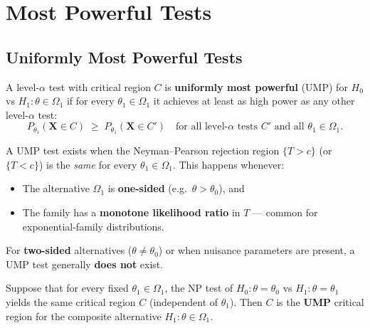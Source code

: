 \documentclass[11pt, a4paper]{article}
\begin{document}
\newpage
\section{Most Powerful Tests}

\subsection*{Uniformly Most Powerful Tests}

\begin{defbox}
A level-$\alpha$ test with critical region $C$ is \textbf{uniformly most powerful} (UMP) for $H_0$ vs $H_1\colon \theta \in \Omega_1$ if for every $\theta_1 \in \Omega_1$ it achieves at least as high power as any other level-$\alpha$ test:
\[
  P_{\theta_1}(\mathbf{X} \in C) \;\geq\; P_{\theta_1}(\mathbf{X} \in C')
  \quad \text{for all level-}\alpha \text{ tests } C' \text{ and all } \theta_1 \in \Omega_1.
\]
\end{defbox}

\begin{warnbox}
A UMP test exists when the Neyman--Pearson rejection region $\{T > c\}$ (or $\{T < c\}$) is the \emph{same} for every $\theta_1 \in \Omega_1$. This happens whenever:
\begin{itemize}
  \item The alternative $\Omega_1$ is \textbf{one-sided} (e.g.\ $\theta > \theta_0$), and
  \item The family has a \textbf{monotone likelihood ratio} in $T$ --- common for exponential-family distributions.
\end{itemize}
For \textbf{two-sided} alternatives ($\theta \neq \theta_0$) or when nuisance parameters are present, a UMP test generally \textbf{does not} exist.
\end{warnbox}

\begin{thmbox}
Suppose that for every fixed $\theta_1 \in \Omega_1$, the NP test of $H_0\colon \theta = \theta_0$ vs $H_1\colon \theta = \theta_1$ yields the same critical region $C$ (independent of $\theta_1$). Then $C$ is the \textbf{UMP} critical region for the composite alternative $H_1\colon \theta \in \Omega_1$.
\end{thmbox}
\end{document}
